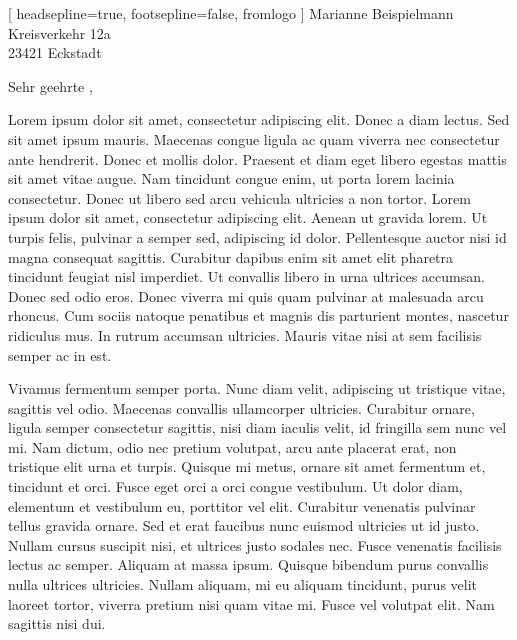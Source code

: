 \documentclass[version=last, fontsize=12pt]{scrlttr2}   %
\begin{document}


\begin{letter}[%
    headsepline=true,%
    footsepline=false,%
    fromlogo%
]{%
    Marianne Beispielmann\\
    Kreisverkehr 12a\\
    23421 Eckstadt%
}

\opening{Sehr geehrte ,}

Lorem ipsum dolor sit amet, consectetur adipiscing elit. Donec a diam lectus. Sed sit amet ipsum mauris. Maecenas congue ligula ac quam viverra nec consectetur ante hendrerit. Donec et mollis dolor. Praesent et diam eget libero egestas mattis sit amet vitae augue. Nam tincidunt congue enim, ut porta lorem lacinia consectetur. Donec ut libero sed arcu vehicula ultricies a non tortor. Lorem ipsum dolor sit amet, consectetur adipiscing elit. Aenean ut gravida lorem. Ut turpis felis, pulvinar a semper sed, adipiscing id dolor. Pellentesque auctor nisi id magna consequat sagittis. Curabitur dapibus enim sit amet elit pharetra tincidunt feugiat nisl imperdiet. Ut convallis libero in urna ultrices accumsan. Donec sed odio eros. Donec viverra mi quis quam pulvinar at malesuada arcu rhoncus. Cum sociis natoque penatibus et magnis dis parturient montes, nascetur ridiculus mus. In rutrum accumsan ultricies. Mauris vitae nisi at sem facilisis semper ac in est.

Vivamus fermentum semper porta. Nunc diam velit, adipiscing ut tristique vitae, sagittis vel odio. Maecenas convallis ullamcorper ultricies. Curabitur ornare, ligula semper consectetur sagittis, nisi diam iaculis velit, id fringilla sem nunc vel mi. Nam dictum, odio nec pretium volutpat, arcu ante placerat erat, non tristique elit urna et turpis. Quisque mi metus, ornare sit amet fermentum et, tincidunt et orci. Fusce eget orci a orci congue vestibulum. Ut dolor diam, elementum et vestibulum eu, porttitor vel elit. Curabitur venenatis pulvinar tellus gravida ornare. Sed et erat faucibus nunc euismod ultricies ut id justo. Nullam cursus suscipit nisi, et ultrices justo sodales nec. Fusce venenatis facilisis lectus ac semper. Aliquam at massa ipsum. Quisque bibendum purus convallis nulla ultrices ultricies. Nullam aliquam, mi eu aliquam tincidunt, purus velit laoreet tortor, viverra pretium nisi quam vitae mi. Fusce vel volutpat elit. Nam sagittis nisi dui.


\end{letter}
\end{document}

